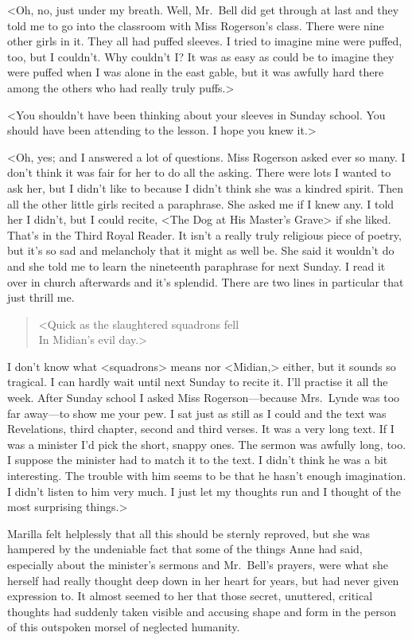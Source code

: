 <Oh, no, just under my breath. Well, Mr.~Bell did get through at last and they told me to go into the classroom with Miss Rogerson's class. There were nine other girls in it. They all had puffed sleeves. I tried to imagine mine were puffed, too, but I couldn't. Why couldn't I\@? It was as easy as could be to imagine they were puffed when I was alone in the east gable, but it was awfully hard there among the others who had really truly puffs.>

<You shouldn't have been thinking about your sleeves in Sunday school. You should have been attending to the lesson. I hope you knew it.>

<Oh, yes; and I answered a lot of questions. Miss Rogerson asked ever so many. I don't think it was fair for her to do all the asking. There were lots I wanted to ask her, but I didn't like to because I didn't think she was a kindred spirit. Then all the other little girls recited a paraphrase. She asked me if I knew any. I told her I didn't, but I could recite, <The Dog at His Master's Grave> if she liked. That's in the Third Royal Reader. It isn't a really truly religious piece of poetry, but it's so sad and melancholy that it might as well be. She said it wouldn't do and she told me to learn the nineteenth paraphrase for next Sunday. I read it over in church afterwards and it's splendid. There are two lines in particular that just thrill me.

\begin{verse}
<Quick as the slaughtered squadrons fell\\
In Midian's evil day.>
\end{verse}

I don't know what <squadrons> means nor <Midian,> either, but it sounds so tragical. I can hardly wait until next Sunday to recite it. I'll practise it all the week. After Sunday school I asked Miss Rogerson—because Mrs.~Lynde was too far away—to show me your pew. I sat just as still as I could and the text was Revelations, third chapter, second and third verses. It was a very long text. If I was a minister I'd pick the short, snappy ones. The sermon was awfully long, too. I suppose the minister had to match it to the text. I didn't think he was a bit interesting. The trouble with him seems to be that he hasn't enough imagination. I didn't listen to him very much. I just let my thoughts run and I thought of the most surprising things.>

Marilla felt helplessly that all this should be sternly reproved, but she was hampered by the undeniable fact that some of the things Anne had said, especially about the minister's sermons and Mr.~Bell's prayers, were what she herself had really thought deep down in her heart for years, but had never given expression to. It almost seemed to her that those secret, unuttered, critical thoughts had suddenly taken visible and accusing shape and form in the person of this outspoken morsel of neglected humanity.
